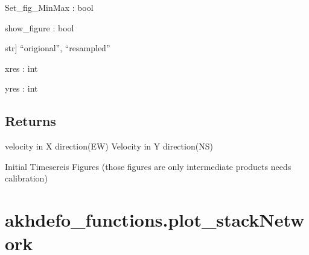 \documentclass[letterpaper,10pt]{sphinxmanual}
\begin{document}
\begin{fulllineitems}
\sphinxAtStartPar
Set\_fig\_MinMax : bool

\sphinxAtStartPar
show\_figure : bool
\begin{description}
\sphinxlineitem{plot\_option}{[}str{]}
\sphinxAtStartPar
“origional”,  “resampled”

\end{description}

\sphinxAtStartPar
xres : int

\sphinxAtStartPar
yres : int


\section{Returns}
\label{\detokenize{generated/akhdefo_functions.DynamicChangeDetection:returns}}\begin{description}
\sphinxAtStartPar
velocity in X direction(EW)
Velocity in Y direction(NS)

\sphinxAtStartPar
Initial Timesereis Figures (those figures are only intermediate products needs calibration)

\end{description}

\end{fulllineitems}


\sphinxstepscope


\chapter{akhdefo\_functions.plot\_stackNetwork}
\label{\detokenize{generated/akhdefo_functions.plot_stackNetwork:akhdefo-functions-plot-stacknetwork}}\label{\detokenize{generated/akhdefo_functions.plot_stackNetwork::doc}}
\end{document}
